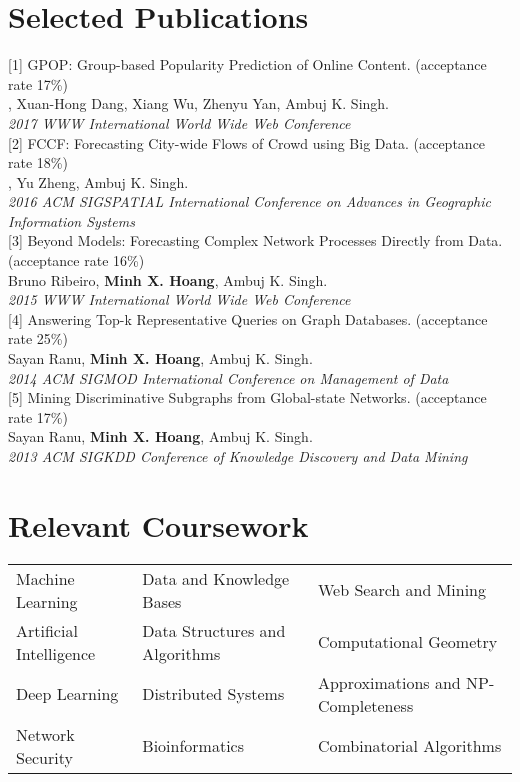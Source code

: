 \documentclass[margin,line]{res}
\begin{document}
\begin{resume}
\section{\sc Selected Publications}
{\small [1]} GPOP: Group-based Popularity Prediction of Online Content. (acceptance rate 17\%)\\  \hspace*{0.2in}{\bf Minh X. Hoang}, Xuan-Hong Dang, Xiang Wu, Zhenyu Yan, Ambuj K. Singh.\\ \hspace*{0.2in}\emph{2017 WWW International World Wide Web Conference}\\
{\small [2]} FCCF: Forecasting City-wide Flows of Crowd using Big Data. (acceptance rate 18\%)\\  \hspace*{0.2in}{\bf Minh X. Hoang}, Yu Zheng, Ambuj K. Singh.\\ \hspace*{0.2in}\emph{2016 ACM SIGSPATIAL International Conference on Advances in Geographic Information Systems}\\
{\small [3]} Beyond Models: Forecasting Complex Network Processes Directly from Data. (acceptance rate 16\%)
\\\hspace*{0.2in}Bruno Ribeiro, {\bf Minh X. Hoang}, Ambuj K. Singh.\\\hspace*{0.2in}\emph{2015 WWW International World Wide Web Conference}\\
{\small [4]} Answering Top-k Representative Queries on Graph Databases. (acceptance rate 25\%)
\\  \hspace*{0.2in}Sayan Ranu, {\bf Minh X. Hoang}, Ambuj K. Singh. \\
\hspace*{0.2in}\emph{2014 ACM SIGMOD International Conference on Management of Data}\\
{\small [5]} Mining Discriminative Subgraphs from Global-state Networks. (acceptance rate 17\%)
\\  \hspace*{0.2in}Sayan Ranu, {\bf Minh X. Hoang}, Ambuj K. Singh.\\\hspace*{0.2in}\emph{2013 ACM SIGKDD Conference of Knowledge Discovery and Data Mining}

\section{\sc Relevant Coursework}
\begin{tabular}{ l l l}
Machine Learning&
Data and Knowledge Bases & 
Web Search and Mining\\
Artificial Intelligence&
Data Structures and Algorithms&
Computational Geometry\\
Deep Learning&
Distributed Systems&
Approximations and NP-Completeness\\
Network Security&
Bioinformatics&
Combinatorial Algorithms\\
\end{tabular}


\end{resume}
\end{document}
